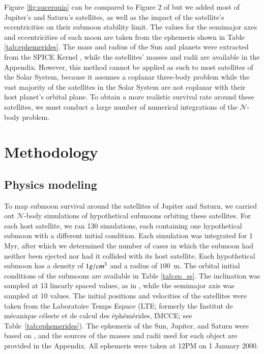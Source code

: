 \documentclass{aa}
\begin{document}
Figure \ref{fig:sucerquia} can be compared to Figure 2 of \cite{Sucerquia2024} but we added most of Jupiter's and Saturn's satellites, as well as the impact of the satellite's eccentricities on their submoon stability limit. The values for the semimajor axes and eccentricities of each moon are taken from the ephemeris shown in Table \ref{tab:ephemerides}. The mass and radius of the Sun and planets were extracted from the SPICE Kernel \cite{ACTON199665}, while the satellites' masses and radii are available in the Appendix. 
However, this method cannot be applied as such to most satellites of the Solar System, because it assumes a coplanar three-body problem while the vast majority of the satellites in the Solar System are not coplanar with their host planet's orbital plane. To obtain a more realistic survival rate around these satellites, we must conduct a large number of numerical integrations of the $\mathcal{N}$-body problem.


\section{Methodology}\label{sect:methodo}
\subsection{Physics modeling}
To map submoon survival around the satellites of Jupiter and Saturn, we carried out $\mathcal{N}$-body simulations of hypothetical submoons orbiting these satellites. For each host satellite, we ran 130 simulations, each containing one hypothetical submoon with a different initial condition. Each simulation was integrated for 1 Myr, after which we determined the number of cases in which the submoon had neither been ejected nor had it collided with its host satellite.
Each hypothetical submoon has a density of $1\space g/cm^3$ and a radius of $100$~m. The orbital initial conditions of the submoons are available in Table \ref{tab:eo_ss}. The inclination was sampled at 13 linearly spaced values, as in \cite{Holman1997}, while the semimajor axis was sampled at 10 values. The initial positions and velocities of the satellites were taken from the Laboratoire Temps Espace (LTE; formerly the Institut de mécanique céleste et de calcul des
éphémérides, IMCCE; see Table~\ref{tab:ephemerides}). The ephemeris of the Sun, Jupiter, and Saturn were based on \cite{inpop21a_ephe}, and the sources of the masses and radii used for each object are provided in the Appendix. All ephemeris were taken at 12PM on 1 January 2000.
\end{document}
